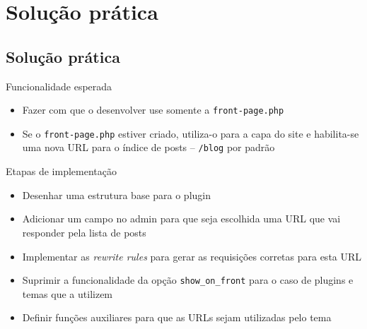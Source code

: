 \documentclass{beamer}
\begin{document}
\section{Solução prática}
\subsection{Solução prática}

\begin{frame}{Funcionalidade esperada}
\begin{itemize}
  \pause \item Fazer com que o desenvolver use somente a \texttt{front-page.php}
  \pause \item Se o \texttt{front-page.php} estiver criado, utiliza-o para a
    capa do site e habilita-se uma nova URL para o índice de posts --
    \texttt{/blog} por padrão
\end{itemize}
\end{frame}

\begin{frame}{Etapas de implementação}
\begin{itemize}
  \pause \item Desenhar uma estrutura base para o plugin
  \pause \item Adicionar um campo no admin para que seja escolhida uma URL
    que vai responder pela lista de posts
  \pause \item Implementar as \emph{rewrite rules} para gerar as requisições
    corretas para esta URL
  \pause \item Suprimir a funcionalidade da opção \texttt{show\_on\_front} para
    o caso de plugins e temas que a utilizem
  \pause \item Definir funções auxiliares para que as URLs sejam utilizadas
    pelo tema
\end{itemize}
\end{frame}

\begin{frame}
  \pause 
  \pause 
  \pause 
\end{frame}

\begin{frame}
  \pause 
  \pause 
  \pause 
  \pause 
\end{frame}
\end{document}
